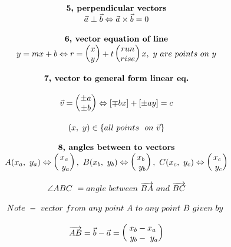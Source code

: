 \documentclass{article}
\begin{document}
\begin{multicols}{2}
\[\begin{array}{>{\displaystyle}c}
        \\
        \textbf{5, perpendicular\ vectors}\\
        \vec{a} \perp \vec{b} \Leftrightarrow \vec{a} \times \vec{b} =0\\
        \\
        \textbf{6, vector\ equation\ of\ line}\\
        y=mx+b\Leftrightarrow r=\begin{pmatrix}
        x\\
        y
        \end{pmatrix} +t\begin{pmatrix}
        run\\
        rise
        \end{pmatrix} {x,\ y\ are\ points\ on\ y}\\
        \\
        \textbf{7, vector\ to\ general\ form\ linear\ eq.}\\
        \\
        \vec{v} =\begin{pmatrix}
        \pm a\\
        \pm b
        \end{pmatrix} \Leftrightarrow [ \mp bx] +[ \pm ay] =c\\
        \\
        ( x,\ y) \in \{all\ points\ \ on\ \vec{v}\}\\
        \\
        \textbf{8, angles\ between\ to\ vectors}\\
        A( x_{a} ,\ y_{a}) \Leftrightarrow \begin{pmatrix}
        x_{a}\\
        \ y_{a}
        \end{pmatrix} ,\ B( x_{b} ,\ y_{b}) \Leftrightarrow \begin{pmatrix}
        x_{b}\\
        \ y_{b}
        \end{pmatrix} ,\ C( x_{c} ,\ y_{c}) \Leftrightarrow \begin{pmatrix}
        x_{c}\\
        \ y_{c}
        \end{pmatrix}\\
        \\
        \angle ABC\ =angle\ between\ \overrightarrow{BA} \ and\ \overrightarrow{BC}\\
        \\
        Note\ -\ vector\ from\ any\ point\ A\ to\ any\ point\ B\ given\ by\ \\
        \\
        \overrightarrow{AB} =\vec{b} - \vec{a} =\begin{pmatrix}
        x_{b} - x_{a}\\
        \ y_{b} - \ y_{a}
        \end{pmatrix}
    \end{array}
    \]
\end{multicols}
\end{document}

